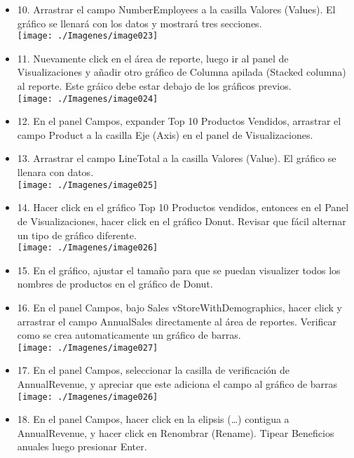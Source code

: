 \begin{itemize}
\item 10. Arrastrar el campo NumberEmployees a la casilla Valores (Values). El gráfico se llenará con los datos y mostrará tres secciones. \\
\texttt{[image: ./Imagenes/image023]}
\item 11. Nuevamente click en el área de reporte, luego ir al panel de Visualizaciones y añadir otro gráfico de Columna apilada (Stacked columna) al reporte. Este gráico debe estar debajo de los gráficos previos. \\
\texttt{[image: ./Imagenes/image024]}

\item 12. En el panel Campos, expander Top 10 Productos Vendidos, arrastrar el campo Product a la casilla Eje (Axis) en el panel de Visualizaciones. \\

\item 13. Arrastrar el campo LineTotal a la casilla Valores (Value). El gráfico se llenara con datos. \\
\texttt{[image: ./Imagenes/image025]}

\item 14. Hacer click en el gráfico Top 10 Productos vendidos, entonces en el Panel de Visualizaciones, hacer click en el gráfico Donut. Revisar que fácil alternar un tipo de gráfico diferente. \\
\texttt{[image: ./Imagenes/image026]}

\item 15. En el gráfico, ajustar el tamaño para que se puedan visualizer todos los nombres de productos en el gráfico de Donut. \\

\item 16. En el panel Campos, bajo Sales vStoreWithDemographics, hacer click y arrastrar el campo AnnualSales directamente al área de reportes. Verificar como se crea automaticamente un gráfico de barras. \\

\texttt{[image: ./Imagenes/image027]}

\item 17. En el panel Campos, seleccionar la casilla de verificación de AnnualRevenue, y apreciar que este adiciona el campo al gráfico de barras \\
\texttt{[image: ./Imagenes/image026]}
\item 18. En el panel Campos, hacer click en la elipsis (…) contigua a AnnualRevenue, y hacer click en Renombrar (Rename). Tipear Beneficios anuales luego presionar Enter. \\


\end{itemize}
